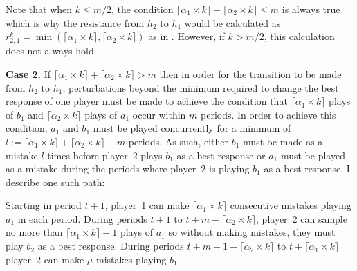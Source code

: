 \documentclass[11.5pt]{article}
\begin{document}
Note that when $k \leq m/2$, the condition $\lceil \alpha_1 \times k \rceil + \lceil \alpha_2 \times k \rceil \leq m$ is always true which is why the resistance from $h_2$ to $h_1$ would be calculated as $r_{2,1}^{k} = \min(\lceil \alpha_1 \times k \rceil, \lceil \alpha_2 \times k \rceil)$ as in \cite{Young1998}. However, if $k > m/2$, this calculation does not always hold. 




{\bf Case 2.} If $\lceil \alpha_1 \times k \rceil + \lceil \alpha_2 \times k \rceil > m$ then in order for the transition to be made from $h_2$ to $h_1$, perturbations beyond the minimum required to change the best response of one player must be made to achieve the condition that $\lceil \alpha_1 \times k \rceil$ plays of $b_1$ and $\lceil \alpha_2 \times k \rceil$ plays of $a_1$ occur within $m$ periods. In order to achieve this condition, $a_1$ and $b_1$ must be played concurrently for a minimum of $l:= \lceil \alpha_1 \times k \rceil+\lceil \alpha_2 \times k \rceil-m$ periods. As such, either $b_1$ must be made as a mistake $l$ times before player~2 plays $b_1$ as a best response or $a_1$ must be played as a mistake during the periods where player~2 is playing $b_1$ as a best response. I describe one such path:

Starting in period $t+1$, player~1 can make $\lceil \alpha_1 \times k \rceil$ consecutive mistakes playing $a_1$ in each period. During periods $t+1$ to $t+m-\lceil \alpha_2 \times k \rceil$, player~2 can sample no more than $\lceil \alpha_1 \times k \rceil - 1$ plays of $a_1$ so without making mistakes, they must play $b_2$ as a best response. During periods $t+m+1-\lceil \alpha_2 \times k \rceil$ to $t+\lceil \alpha_1 \times k \rceil$ player~2 can make $\mu$ mistakes playing $b_1$. 
\end{document}
